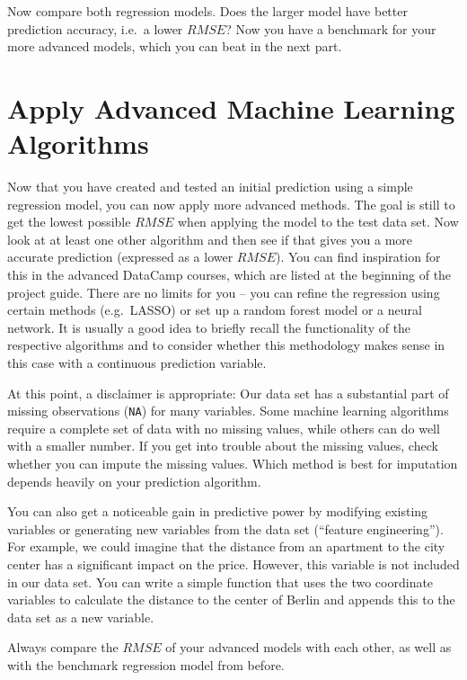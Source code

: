 \documentclass[
  11pt,
]{book}
\begin{document}
Now compare both regression models. Does the larger model have better
prediction accuracy, i.e.~a lower \(RMSE\)? Now you have a benchmark for
your more advanced models, which you can beat in the next part.

\hypertarget{apply-advanced-machine-learning-algorithms}{%
\section{Apply Advanced Machine Learning
Algorithms}\label{apply-advanced-machine-learning-algorithms}}

Now that you have created and tested an initial prediction using a
simple regression model, you can now apply more advanced methods. The
goal is still to get the lowest possible \(RMSE\) when applying the
model to the test data set. Now look at at least one other algorithm and
then see if that gives you a more accurate prediction (expressed as a
lower \(RMSE\)). You can find inspiration for this in the advanced
DataCamp courses, which are listed at the beginning of the project
guide. There are no limits for you -- you can refine the regression
using certain methods (e.g.~LASSO) or set up a random forest model or a
neural network. It is usually a good idea to briefly recall the
functionality of the respective algorithms and to consider whether this
methodology makes sense in this case with a continuous prediction
variable.

At this point, a disclaimer is appropriate: Our data set has a
substantial part of missing observations (\texttt{NA}) for many
variables. Some machine learning algorithms require a complete set of
data with no missing values, while others can do well with a smaller
number. If you get into trouble about the missing values, check whether
you can impute the missing values. Which method is best for imputation
depends heavily on your prediction algorithm.

You can also get a noticeable gain in predictive power by modifying
existing variables or generating new variables from the data set
(``feature engineering''). For example, we could imagine that the
distance from an apartment to the city center has a significant impact
on the price. However, this variable is not included in our data set.
You can write a simple function that uses the two coordinate variables
to calculate the distance to the center of Berlin and appends this to
the data set as a new variable.

Always compare the \(RMSE\) of your advanced models with each other, as
well as with the benchmark regression model from before.
\end{document}
